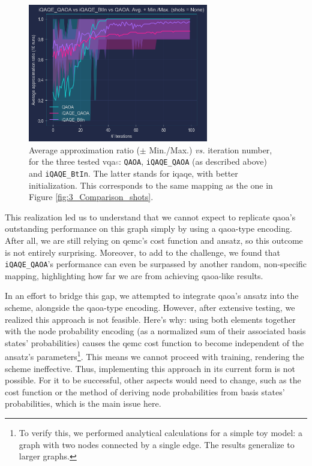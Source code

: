 \begin{figure}[H]
  \centering
  \includegraphics[width=0.70\textwidth]{Figures/Chapter_5/iQAQE_QAOA.png}
  \caption{Average approximation ratio ($\pm$ Min./Max.) \textit{vs.} iteration number, for the three tested \acrshort{vqa}\textcolor{gray}{s}: \texttt{QAOA}, \texttt{iQAQE\_QAOA} (as described above) and \texttt{iQAQE\_BtIn}. The latter stands for \acrshort{iqaqe}, with better initialization. This corresponds to the same mapping as the one in Figure \ref{fig:3_Comparison_shots}.}
  \label{fig:iQAQE_QAOA}
\end{figure}

This realization led us to understand that we cannot expect to replicate \acrshort{qaoa}'s outstanding performance on this graph simply by using a \acrshort{qaoa}-type encoding. After all, we are still relying on \acrshort{qemc}'s cost function and ansatz, so this outcome is not entirely surprising. Moreover, to add to the challenge, we found that \texttt{iQAQE\_QAOA}'s performance can even be surpassed by another random, non-specific mapping, highlighting how far we are from achieving \acrshort{qaoa}-like results.

In an effort to bridge this gap, we attempted to integrate \acrshort{qaoa}'s ansatz into the scheme, alongside the \acrshort{qaoa}-type encoding. However, after extensive testing, we realized this approach is not feasible. Here's why: using both elements together with the node probability encoding (as a normalized sum of their associated basis states' probabilities) causes the \acrshort{qemc} cost function to become independent of the ansatz's parameters\footnote{To verify this, we performed analytical calculations for a simple toy model: a graph with two nodes connected by a single edge. The results generalize to larger graphs.}. This means we cannot proceed with training, rendering the scheme ineffective. Thus, implementing this approach in its current form is not possible. For it to be successful, other aspects would need to change, such as the cost function or the method of deriving node probabilities from basis states' probabilities, which is the main issue here.









